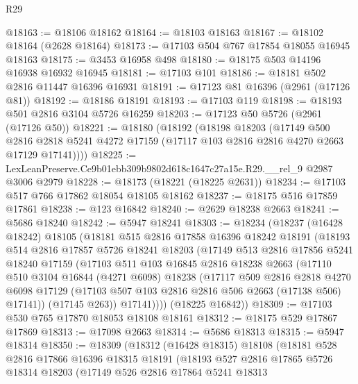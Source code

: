 \begin{lexlean}{R29}
\begin{coremodule}
@18163 := @18106 @18162
@18164 := @18103 @18163
@18167 := @18102 @18164 (@2628 @18164)
@18173 := @17103 @504 @767 @17854 @18055 @16945 @18163
@18175 := @3453 @16958 @498
@18180 := @18175 @503 @14196 @16938 @16932 @16945
@18181 := @17103 @101
@18186 := @18181 @502 @2816 @11447 @16396 @16931
@18191 := @17123 @81 @16396 (@2961 (@17126 @81))
@18192 := @18186 @18191
@18193 := @17103 @119
@18198 := @18193 @501 @2816 @3104 @5726 @16259
@18203 := @17123 @50 @5726 (@2961 (@17126 @50))
@18221 := @18180
    (@18192
      (@18198
        @18203
        (@17149
          @500
          @2816
          @2818
          @5241
          @4272
          @17159
          (@17117 @103 @2816 @2816 @4270 @2663 @17129 @17141))))
@18225 := LexLeanPreserve.Ce9b01ebb309b9802d618c1647c27a15e.R29.__rel_9 @2987 @3006 @2979
@18228 := @18173 (@18221 (@18225 @2631))
@18234 := @17103 @517 @766 @17862 @18054 @18105 @18162
@18237 := @18175 @516 @17859 @17861
@18238 := @123 @16842
@18240 := @2629 @18238 @2663
@18241 := @5686 @18240
@18242 := @5947 @18241
@18303 := @18234
    (@18237
      (@16428 @18242)
      @18105
      (@18181
        @515
        @2816
        @17858
        @16396
        @18242
        @18191
        (@18193
          @514
          @2816
          @17857
          @5726
          @18241
          @18203
          (@17149
            @513
            @2816
            @17856
            @5241
            @18240
            @17159
            (@17103
              @511
              @103
              @16845
              @2816
              @18238
              @2663
              (@17110
                @510
                @3104
                @16844
                (@4271 @6098)
                @18238
                (@17117
                  @509
                  @2816
                  @2818
                  @4270
                  @6098
                  @17129
                  (@17103 @507 @103 @2816 @2816 @506 @2663 (@17138 @506) @17141))
                (@17145 @263))
              @17141))))
      (@18225 @16842))
@18309 := @17103 @530 @765 @17870 @18053 @18108 @18161
@18312 := @18175 @529 @17867 @17869
@18313 := @17098 @2663
@18314 := @5686 @18313
@18315 := @5947 @18314
@18350 := @18309
    (@18312
      (@16428 @18315)
      @18108
      (@18181
        @528
        @2816
        @17866
        @16396
        @18315
        @18191
        (@18193
          @527
          @2816
          @17865
          @5726
          @18314
          @18203
          (@17149
            @526
            @2816
            @17864
            @5241
            @18313

\end{coremodule}
\end{lexlean}
